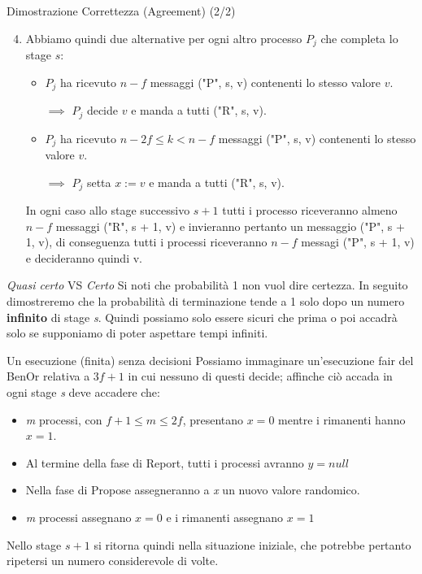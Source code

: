 \documentclass{beamer}
\begin{document}
\begin{frame}{Dimostrazione Correttezza (Agreement) (2/2)}
    \begin{enumerate}
        \setcounter{enumi}{3}
        \item Abbiamo quindi due alternative per ogni altro processo $P_{j}$ che completa lo stage $s$:
        \begin{itemize}
            \item $P_{j}$ ha ricevuto $n - f$ messaggi ("P", s, v) contenenti lo stesso valore $v$.
            \begin{addmargin}[1em]{2em}
            $\implies$ $P_{j}$ decide $v$ e manda a tutti ("R", s, v). 
            \end{addmargin}
            
            \item $P_{j}$ ha ricevuto $n - 2f \leq k < n - f$ messaggi ("P", s, v) contenenti lo stesso valore $v$.
            \begin{addmargin}[1em]{2em}
            $\implies$ $P_{j}$ setta $x := v$ e manda a tutti ("R", s, v). 
            \end{addmargin}
        \end{itemize}
        
        In ogni caso allo stage successivo $s + 1$ tutti i processo riceveranno almeno $n - f$ messaggi ("R", s + 1, v) e invieranno pertanto un messaggio ("P", s + 1, v), di conseguenza tutti i processi riceveranno $n - f$ messagi ("P", s + 1, v) e decideranno quindi v.
    \end{enumerate}
\end{frame}

\begin{frame}{\textit{Quasi certo} VS \textit{Certo}}
    Si noti che probabilità 1 non vuol dire certezza. In seguito dimostreremo che la probabilità di terminazione tende a 1 solo dopo un numero \textbf{infinito} di stage \textit{s}. Quindi possiamo solo essere sicuri che prima o poi accadrà solo se supponiamo di poter aspettare tempi infiniti.
\end{frame}

\begin{frame}{Un esecuzione (finita) senza decisioni}
    Possiamo immaginare un'esecuzione fair del BenOr relativa a $3f+1$ in cui nessuno di questi decide; affinche ciò accada in ogni stage \textit{s} deve accadere che:
    \begin{itemize}
        \item \textit{m} processi, con $f+1 \leq m \leq 2f$, presentano $x = 0$ mentre i rimanenti hanno $x = 1$.
        \item Al termine della fase di Report, tutti i processi avranno $y = null$ %
        \item Nella fase di Propose assegneranno a \textit{x} un nuovo valore randomico.
        \item \textit{m} processi assegnano $x = 0$ e i rimanenti assegnano $x = 1$
    \end{itemize}
    Nello stage $s + 1$ si ritorna quindi nella situazione iniziale, che potrebbe pertanto ripetersi un numero considerevole di volte.
\end{frame}
\end{document}
